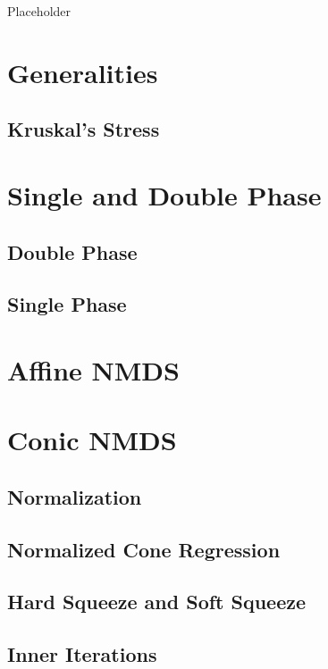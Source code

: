 \documentclass[
  12pt,
]{book}
\begin{document}
Placeholder

\section{Generalities}\label{generalities}

\subsection{Kruskal's Stress}\label{kruskals-stress-1}

\section{Single and Double Phase}\label{nmssingledouble}

\subsection{Double Phase}\label{double-phase}

\subsection{Single Phase}\label{nmssinglephase}

\section{Affine NMDS}\label{affine-nmds}

\section{Conic NMDS}\label{nmdsconic}

\subsection{Normalization}\label{nmdsnorm}

\subsection{Normalized Cone Regression}\label{normalized-cone-regression}

\subsection{Hard Squeeze and Soft Squeeze}\label{hard-squeeze-and-soft-squeeze}

\subsection{Inner Iterations}\label{inner-iterations}
\end{document}
